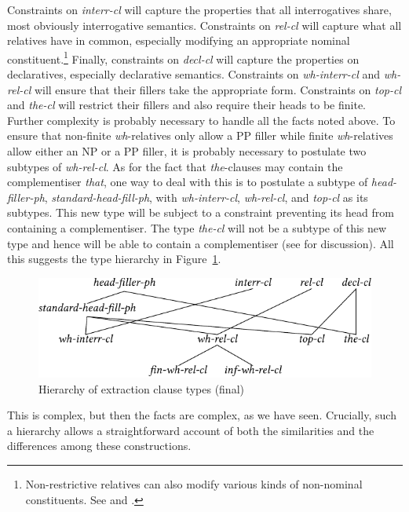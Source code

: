 \documentclass[output=paper
	        ,collection
	        ,collectionchapter
 	        ,biblatex
                ,babelshorthands
                ,newtxmath
                ,draftmode
                ,colorlinks, citecolor=brown
]{langscibook}
\begin{document}
{\noindent
Constraints on \emph{interr-cl} will capture the properties that all
interrogatives share, most obviously interrogative semantics.
Constraints on \emph{rel-cl} will capture what all relatives have in
common, especially modifying an appropriate nominal
constituent.\footnote{Non-restrictive relatives can also modify various
  kinds of non-nominal constituents. See \citet{Arnold:04} and
  \citet{Arnold:Borsley:08}.} Finally, constraints on \emph{decl-cl}
will capture the properties on declaratives, especially declarative
semantics.  Constraints on \emph{wh-interr-cl} and \emph{wh-rel-cl}
will ensure that their fillers take the appropriate form. Constraints
on \emph{top-cl} and \emph{the-cl} will restrict their fillers and
also require their heads to be finite. Further complexity is probably
necessary to handle all the facts noted above. To ensure that
non-finite \emph{wh}-relatives only allow a PP filler while finite
\emph{wh}-relatives allow either an NP or a PP filler, it is probably
necessary to postulate two subtypes of \emph{wh-rel-cl}. As for the
fact that \emph{the}-clauses may contain the complementiser
\emph{that}, one way to deal with this is to postulate a subtype of
\emph{head-filler-ph}, \emph{standard-head-fill-ph}, with
\emph{wh-interr-cl}, \emph{wh-rel-cl}, and \emph{top-cl} as its
subtypes. This new type will be subject to a constraint preventing its
head from containing a complementiser. The type \emph{the-cl} will not
be a subtype of this new type and hence will be able to contain a
complementiser (see \citealt[13--15]{Borsley:11} for discussion). All this suggests
the type hierarchy in Figure~\ref{fig:UDC:50}. 
%
\begin{figure}[htb]
  \centering
  \includegraphics{figures/BB-extraction-function-hier-full-crop}
  \caption{\label{fig:UDC:50}Hierarchy of extraction clause types (final)}
  
\end{figure}
%
%
This is complex, but then the facts are complex, as we have seen.
Crucially, such a hierarchy allows a straightforward account of both the
similarities and the differences among these constructions.

}
\end{document}
